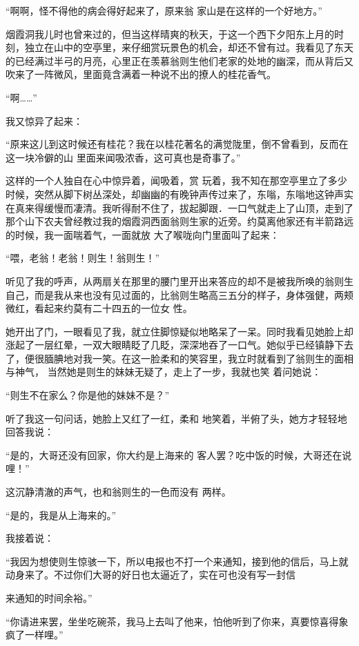 \documentclass{article}
\begin{document}
“啊啊，怪不得他的病会得好起来了，原来翁
家山是在这样的一个好地方。” 

烟霞洞我儿时也曾来过的，但当这样晴爽的秋天，于这一个西下夕阳东上月的时刻，独立在山中的空亭里，来仔细赏玩景色的机会，却还不曾有过。我看见了东天的已经满过半弓的月亮，心里正在羡慕翁则生他们老家的处地的幽深，而从背后又吹来了一阵微风，里面竟含满着一种说不出的撩人的桂花香气。
 


“啊……” 


我又惊异了起来： 

“原来这儿到这时候还有桂花？我在以桂花著名的满觉陇里，倒不曾看到，反而在这一块冷僻的山
里面来闻吸浓香，这可真也是奇事了。” 

这样的一个人独自在心中惊异着，闻吸着，赏
\newpage
玩着，我不知在那空亭里立了多少时候，突然从脚下树丛深处，却幽幽的有晚钟声传过来了，东嗡，东嗡地这钟声实在真来得缓慢而凄清。我听得耐不住了，拔起脚跟．一口气就走上了山顶，走到了那个山下农夫曾经教过我的烟霞洞西面翁则生家的近旁。约莫离他家还有半箭路远的时候，我一面喘着气，一面就放
大了喉咙向门里面叫了起来： 


“喂，老翁！老翁！则生！翁则生！” 

听见了我的呼声，从两扇关在那里的腰门里开出来答应的却不是被我所唤的翁则生自己，而是我从来也没有见过面的，比翁则生略高三五分的样子，身体强健，两颊微红，看起来约莫有二十四五的一位女
性。 

她开出了门，一眼看见了我，就立住脚惊疑似地略呆了一呆。同时我看见她脸上却涨起了一层红晕，一双大眼睛眨了几眨，深深地吞了一口气。她似乎已经镇静下去了，便很腼腆地对我一笑。在这一脸柔和的笑容里，我立时就看到了翁则生的面相与神气，
\newpage
当然她是则生的妹妹无疑了，走上了一步，我就也笑
着问她说： 


“则生不在家么？你是他的妹妹不是？” 

听了我这一句问话，她脸上又红了一红，柔和
地笑着，半俯了头，她方才轻轻地回答我说： 

“是的，大哥还没有回家，你大约是上海来的
客人罢？吃中饭的时候，大哥还在说哩！” 

这沉静清澈的声气，也和翁则生的一色而没有
两样。 


“是的，我是从上海来的。” 


我接着说： 

“我因为想使则生惊骇一下，所以电报也不打一个来通知，接到他的信后，马上就动身来了。不过你们大哥的好日也太逼近了，实在可也没有写一封信
\newpage

来通知的时间余裕。” 

“你请进来罢，坐坐吃碗茶，我马上去叫了他来，怕他听到了你来，真要惊喜得象疯了一样哩。”
\end{document}
